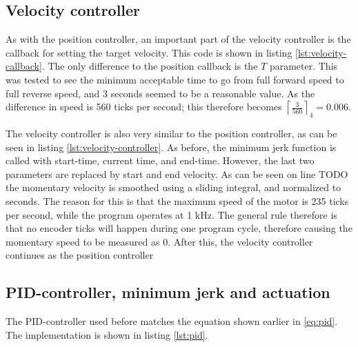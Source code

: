 \documentclass[11pt]{article}
\begin{document}


\subsection{Velocity controller}
As with the position controller, an important part of the velocity controller is the callback for setting the target velocity. This code is shown in listing \vref{lst:velocity-callback}. The only difference to the position callback is the $T$ parameter. This was tested to see the minimum acceptable time to go from full forward speed to full reverse speed, and 3 seconds seemed to be a reasonable value. As the difference in speed is 560 ticks per second; this therefore becomes $\left\lceil\frac{3}{560}\right\rceil _4 = 0.006$. \par



The velocity controller is also very similar to the position controller, as can be seen in listing \vref{lst:velocity-controller}. As before, the minimum jerk function is called with start-time, current time, and end-time. However, the last two parameters are replaced by  start and end velocity. As can be seen on line TODO the momentary velocity is smoothed using a sliding integral, and normalized to seconds. The reason for this is that the maximum speed of the motor is 235 ticks per second, while the program operates at 1 kHz. The general rule therefore is that no encoder ticks will happen during one program cycle, therefore causing the momentary speed to be measured as 0. After this, the velocity controller continues as the position controller



\subsection{PID-controller, minimum jerk and actuation}
The PID-controller used before matches the equation shown earlier in \vref{eq:pid}. The implementation is shown in listing \vref{lst:pid}.


\end{document}
